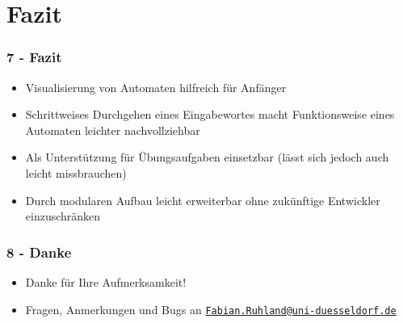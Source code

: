 \documentclass[9pt, xcolor={dvipsnames}]{beamer}
\begin{document}
\section{Fazit}
\begin{frame}\frametitle{7 - Fazit}
	\begin{itemize}
		\item Visualisierung von Automaten hilfreich für Anfänger
		\item Schrittweises Durchgehen eines Eingabewortes macht Funktionsweise eines Automaten leichter nachvollziehbar
		\item Als Unterstützung für Übungsaufgaben einsetzbar (lässt sich jedoch auch leicht missbrauchen)
		\item Durch modularen Aufbau leicht erweiterbar ohne zukünftige Entwickler einzuschränken
	\end{itemize}
\end{frame}

\begin{frame}\frametitle{8 - Danke}
	\begin{itemize}
		\item Danke für Ihre Aufmerksamkeit!
		\pause
		\item Fragen, Anmerkungen und Bugs an \href{mailto:Fabian.Ruhland@uni-duesseldorf.de}{\nolinkurl{Fabian.Ruhland@uni-duesseldorf.de}}
	\end{itemize}
\end{frame}

\end{document}
